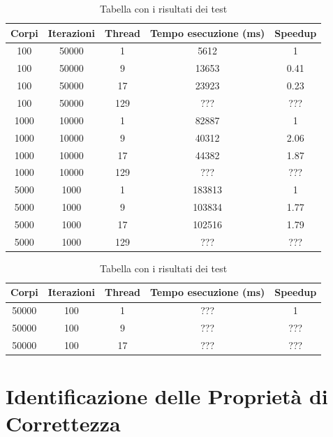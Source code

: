 \documentclass[12pt,a4paper,openright,twoside]{book}
\begin{document}
\begin{center}
	\begin{table}
		\begin{tabular}{ |c|c|c|c|c| } 
			\hline
				Corpi & Iterazioni & Thread & Tempo esecuzione (ms) & Speedup \\
			\hline
				100  & 50000  & 1 & 5612 & 1 \\
			\hline
				100  & 50000  & 9 & 13653 & 0.41 \\
			\hline
				100  & 50000  & 17 & 23923 & 0.23 \\
			\hline
				100  & 50000  & 129 & ??? & ??? \\
			\hline
				1000  & 10000  & 1 & 82887 & 1 \\
			\hline
				1000  & 10000  & 9 & 40312 & 2.06 \\
			\hline
				1000  & 10000  & 17 & 44382 & 1.87 \\
			\hline
				1000  & 10000  & 129 & ??? & ??? \\
			\hline
				5000  & 1000  & 1 & 183813 & 1 \\
			\hline
				5000  & 1000  & 9 & 103834 & 1.77 \\
			\hline
				5000  & 1000  & 17 & 102516 & 1.79 \\
			\hline
				5000  & 1000  & 129 & ??? & ??? \\
			\hline
		\end{tabular}
		\label{tab:table1}
		\caption{Tabella con i risultati dei test}
	\end{table}
\end{center}

\begin{center}
	\begin{table}
		\begin{tabular}{ |c|c|c|c|c| } 
			\hline
				Corpi & Iterazioni & Thread & Tempo esecuzione (ms) & Speedup \\
			\hline
				50000  & 100  & 1 & ??? & 1 \\
			\hline
				50000  & 100  & 9 & ??? & ??? \\
			\hline
				50000  & 100  & 17 & ??? & ??? \\
			\hline
		\end{tabular}
		\label{tab:table2}
		\caption{Tabella con i risultati dei test}
	\end{table}
\end{center}

\chapter{Identificazione delle Proprietà di Correttezza} %
\label{chap:Identificazione delle Proprietà di Correttezza}
\end{document}
